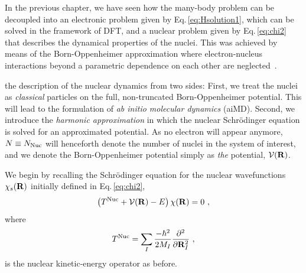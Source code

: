 In the previous chapter, we have seen how the many-body problem can be decoupled into an electronic problem given by Eq.\,\eqref{eq:Hsolution1}, which can be solved in the framework of DFT, and a nuclear problem given by Eq.\,\eqref{eq:chi2} that describes the dynamical properties of the nuclei. This was achieved by means of the Born-Oppenheimer approximation where electron-nucleus interactions beyond a parametric dependence on each other are neglected~\cite{BornOppenheimer}.

 the description of the nuclear dynamics from two sides: First, we treat the nuclei as \emph{classical} particles on the full, non-truncated Born-Oppenheimer potential. This will lead to the formulation of \emph{ab initio molecular dynamics} (aiMD). 
Second, we introduce the \emph{harmonic approximation} in which the nuclear Schr\"odinger equation is solved for an approximated potential.
As no electron will appear anymore, $N \equiv N_{\rm Nuc}$ will henceforth denote the number of nuclei in the system of interest, and we denote the Born-Oppenheimer potential simply as \emph{the} potential, $\mathcal V ({\bf R})$.

We begin by recalling the Schr\"odinger equation for the nuclear wavefunctions $\chi_s ({\bf R})$ initially defined in Eq.\,\eqref{eq:chi2},
\begin{align}
  \left( T^{\rm Nuc} + \mathcal V ({\bf R}) - E \right) \chi ({\bf R})
  = 0~,
  \label{eq:BOSE}
\end{align}
where
\begin{align}
  T^{\rm Nuc}
    = \sum_I \frac{- \hbar^2}{2 M_I} \frac{\partial^2}{\partial {\bf R}_I^2}~,
  \label{eq:Tnuc2}
\end{align}
is the nuclear kinetic-energy operator as before.


